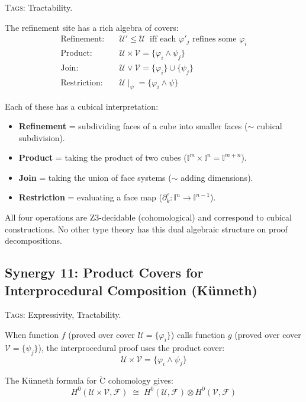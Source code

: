 \documentclass[11pt,a4paper]{article}
\theoremstyle{definition}
\theoremstyle{plain}
\newcommand{\Cech}{\check{\mathrm{C}}}
\newcommand{\covers}{\mathcal{U}}
\newcommand{\Hzero}{H^0}
\newcommand{\presheaf}{\mathcal{F}}
\newcommand{\restr}[2]{#1\!\!\mid_{#2}}
\newcommand{\interval}{\mathbb{I}}
\begin{document}
\textsc{Tags:} Tractability.

\medskip\noindent
The refinement site has a rich algebra of covers:
\begin{align*}
  \text{Refinement:}\quad & \covers' \leq \covers
    \;\;\text{iff each } \varphi'_j \text{ refines some } \varphi_i \\
  \text{Product:}\quad & \covers \times \mathcal{V}
    = \{\varphi_i \wedge \psi_j\} \\
  \text{Join:}\quad & \covers \vee \mathcal{V}
    = \{\varphi_i\} \cup \{\psi_j\} \\
  \text{Restriction:}\quad & \restr{\covers}{\psi}
    = \{\varphi_i \wedge \psi\}
\end{align*}

Each of these has a cubical interpretation:
\begin{itemize}
\item \textbf{Refinement} = subdividing faces of a cube into
  smaller faces ($\sim$ cubical subdivision).
\item \textbf{Product} = taking the product of two cubes
  ($\interval^m \times \interval^n = \interval^{m+n}$).
\item \textbf{Join} = taking the union of face systems
  ($\sim$ adding dimensions).
\item \textbf{Restriction} = evaluating a face map
  ($\partial^\varepsilon_k : \interval^n \to \interval^{n-1}$).
\end{itemize}

All four operations are Z3-decidable (cohomological) and correspond
to cubical constructions.  No other type theory has this dual
algebraic structure on proof decompositions.


\subsection{Synergy 11: Product Covers for Interprocedural Composition (K\"unneth)}
\label{sec:syn-kunneth}

\textsc{Tags:} Expressivity, Tractability.

\medskip\noindent
When function $f$ (proved over cover $\covers = \{\varphi_i\}$)
calls function $g$ (proved over cover $\mathcal{V} = \{\psi_j\}$),
the interprocedural proof uses the product cover:
\[
  \covers \times \mathcal{V} = \{\varphi_i \wedge \psi_j\}
\]

The K\"unneth formula for $\Cech$ cohomology gives:
\[
  \Hzero(\covers \times \mathcal{V}, \presheaf)
  \;\cong\;
  \Hzero(\covers, \presheaf) \otimes \Hzero(\mathcal{V}, \presheaf)
\]
\end{document}
